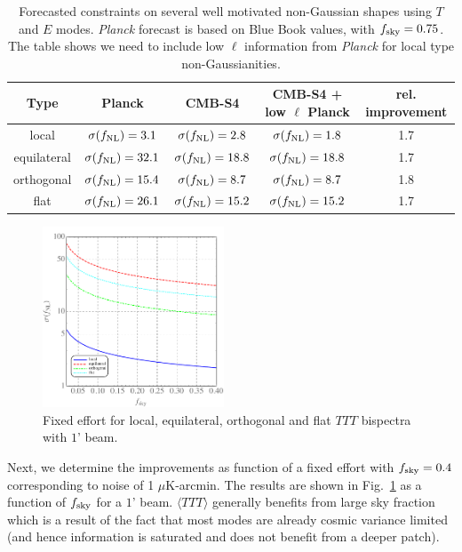 \begin{table}[t]
  \begin{center}
    \begin{tabular}{ | c || c | c | c | c |}
      \hline
      Type & Planck & CMB-S4 & CMB-S4 + low $\ell$ Planck & rel. improvement \\ \hline \hline
      local & $\sigma(f_{\rm NL}) = 3.1$ & $\sigma(f_{\rm NL}) = 2.8$ &  $\sigma(f_{\rm NL}) = 1.8$ & 1.7\\ \hline 
      equilateral &  $\sigma(f_{\rm NL}) = 32.1$ & $\sigma(f_{\rm NL}) = 18.8$ &  $\sigma(f_{\rm NL}) = 18.8$ & 1.7\\ \hline 
      orthogonal &  $\sigma(f_{\rm NL}) = 15.4$ & $\sigma(f_{\rm NL}) = 8.7$ &  $\sigma(f_{\rm NL}) = 8.7$ & 1.8\\ \hline 
      flat &  $\sigma(f_{\rm NL}) = 26.1$ & $\sigma(f_{\rm NL}) = 15.2$ &  $\sigma(f_{\rm NL}) = 15.2$ & 1.7\\ \hline 
    \end{tabular}
  \end{center}
  \caption{Forecasted constraints on several well motivated non-Gaussian shapes using $T$ and $E$ modes. {\it Planck} forecast is based on Blue Book values, with $f_{\rm sky} = 0.75$. The table shows we need to include low $\ell$ information from {\it Planck} for local type non-Gaussianities.}
  \label{tab:fnl_forecast}
\end{table}

\begin{figure}[htbp!]
\centering
\includegraphics[width=0.48\textwidth]{Inflation/FixedEffortTTT_all}
\caption{Fixed effort for local, equilateral, orthogonal and flat $TTT$ bispectra with $1$' beam. }
\label{fig_TTTfixedeffort}
\end{figure}
Next, we determine the improvements as function of a fixed effort with $f_{\rm sky} = 0.4$ corresponding to noise of 1 $\mu$K-arcmin.  The results are shown in Fig.~\ref{fig_TTTfixedeffort} as a function of $f_{\rm sky}$ for a $1$' beam. $\langle TTT \rangle$ generally benefits from large sky fraction which is a result of the fact that most modes are already cosmic variance limited (and hence information is saturated and does not benefit from a deeper patch). 


